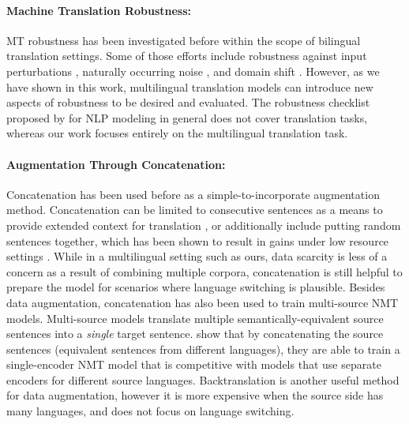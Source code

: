 \paragraph{Machine Translation Robustness:} MT robustness has been investigated before within the scope of bilingual translation settings.
Some of those efforts include robustness against input perturbations \cite{cheng-etal-2018-towards}, naturally occurring noise \cite{vaibhav-etal-2019-improving}, and domain shift \cite{muller-etal-2020-domain}.
However, as we have shown in this work, multilingual translation models can introduce new aspects of robustness to be desired and evaluated.
The robustness checklist proposed by \citet{ribeiro-etal-2020-beyond} for NLP modeling in general does not cover translation tasks, whereas our work focuses entirely on the multilingual translation task.

\paragraph{Augmentation Through Concatenation:} Concatenation has been used before as a simple-to-incorporate augmentation method. Concatenation can be limited to consecutive sentences as a means to provide extended context for translation \cite{tiedemann-scherrer-2017-neural,Agrawal2018ContextualHI}, or additionally include putting random sentences together, which has been shown to result in gains under low resource settings \cite{nguyen-etal-2021-data,kondo-etal-2021-sentence}. While in a multilingual setting such as ours, data scarcity is less of a concern as a result of combining multiple corpora, concatenation is still helpful to prepare the model for scenarios where language switching is plausible.
Besides data augmentation, concatenation has also been used to train multi-source NMT models. Multi-source models \cite{och-ney-2001-statistical} translate multiple semantically-equivalent source sentences into a \textit{single} target sentence.  show that by concatenating the source sentences (equivalent sentences from different languages), they are able to train a single-encoder NMT model that is competitive with models that use separate encoders for different source languages.
Backtranslation \cite{sennrich-etal-2016-improving} is another useful method for data augmentation, however it is more expensive when the source side has many languages, and does not focus on language switching. 

